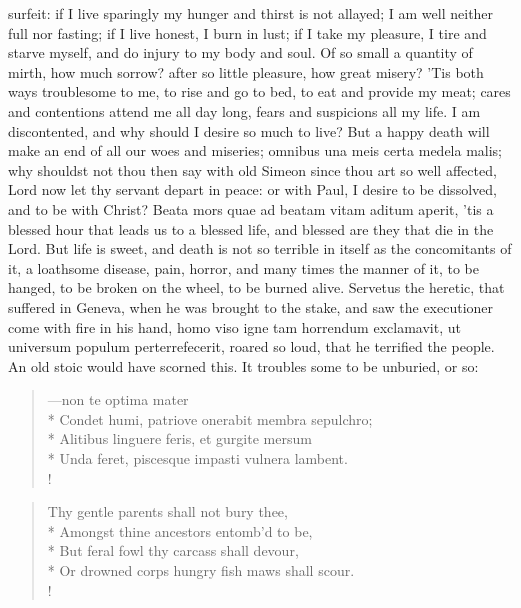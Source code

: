 {surfeit: if I live sparingly my hunger and thirst is not allayed; I am
well neither full nor fasting; if I live honest, I burn in lust; if I
take my pleasure, I tire and starve myself, and do injury to my body
and soul. Of so small a quantity of mirth, how much sorrow? after
so little pleasure, how great misery? 'Tis both ways troublesome to me,
to rise and go to bed, to eat and provide my meat; cares and
contentions attend me all day long, fears and suspicions all my life. I
am discontented, and why should I desire so much to live? But a happy
death will make an end of all our woes and miseries; omnibus una meis
certa medela malis; why shouldst not thou then say with old Simeon
since thou art so well affected, Lord now let thy servant depart in
peace: or with Paul, I desire to be dissolved, and to be with Christ?
Beata mors quae ad beatam vitam aditum aperit, 'tis a blessed hour that
leads us to a blessed life, and blessed are they that die in the
Lord. But life is sweet, and death is not so terrible in itself as the
concomitants of it, a loathsome disease, pain, horror, \etc{} and many
times the manner of it, to be hanged, to be broken on the wheel, to be
burned alive. Servetus the heretic, that suffered in Geneva, when
he was brought to the stake, and saw the executioner come with fire in
his hand, homo viso igne tam horrendum exclamavit, ut universum populum
perterrefecerit, roared so loud, that he terrified the people. An old
stoic would have scorned this. It troubles some to be unburied, or so:
%
\begin{latin}%
\begin{verse}%
---non te optima mater\\*
Condet humi, patriove onerabit membra sepulchro;\\*
Alitibus linguere feris, et gurgite mersum\\*
Unda feret, piscesque impasti vulnera lambent.\\!
\end{verse}%
\end{latin}%
\translationrule%
\begin{verse}%
Thy gentle parents shall not bury thee,\\*
Amongst thine ancestors entomb'd to be,\\*
But feral fowl thy carcass shall devour,\\*
Or drowned corps hungry fish maws shall scour.\\!
\end{verse}%
}
